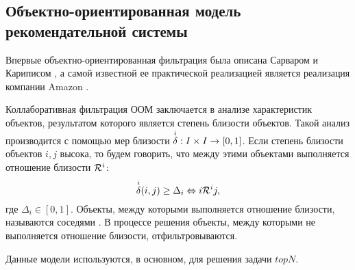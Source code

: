 \subsection{Объектно-ориентированная модель рекомендательной
системы}
Впервые объектно-ориентированная фильтрация была описана
Сарваром \cite{item-based} и Кариписом \cite{topn1,topn2}, а самой известной
ее практической реализацией является реализация
компании Amazon \cite{amazon-item2item}.

Коллаборативная фильтрация ООМ заключается в анализе характеристик
объектов, результатом которого является степень близости объектов.
Такой анализ производится с помощью мер близости ${\overset{i}{\mathcal{\delta}}}: I \times I \rightarrow
[0,1]$. Если степень близости объектов $i, j$ высока, то будем говорить, что
между этими объектами выполняется отношение близости $\mathcal{R}^i$:
\begin{equation}
	\label{rt-ors}
{\overset{i}{\mathcal{\delta}}}(i, j) \ge \Delta_i \Leftrightarrow i \mathcal{R}^i j,
\end{equation}
где $\Delta_i \in [0,1]$.
Объекты, между которыми выполняется отношение близости,
называются соседями \cite{item-based}.
В процессе решения объекты, между которыми не выполняется отношение близости,
отфильтровываются.

Данные модели используются, в основном, для решения задачи $topN$.







